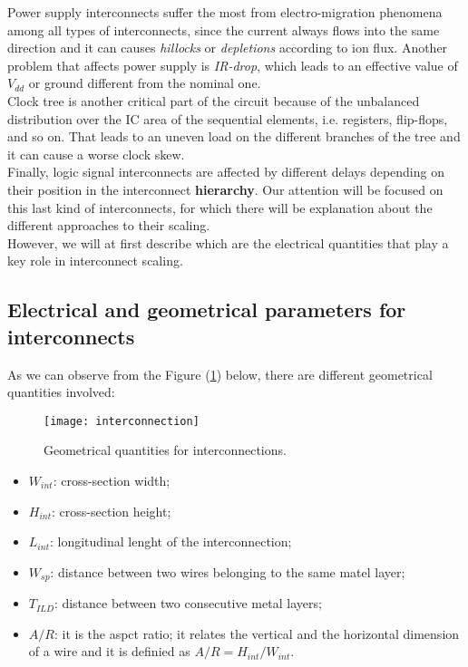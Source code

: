 \documentclass[a4paper, 12pt, twoside, openright]{report}
\begin{document}
Power supply interconnects suffer the most from electro-migration phenomena among all types of interconnects, since the current always flows into the same direction and it can causes \textit{hillocks} or \textit{depletions} according to ion flux. Another problem that affects power supply is \textit{IR-drop}, which leads to an effective value of $V_{dd}$ or ground different from the nominal one.\\ Clock tree is another critical part of the circuit because of the unbalanced distribution over the IC area of the sequential elements, i.e. registers, flip-flops, and so on. That leads to an uneven load on the different branches of the tree and it can cause a worse clock skew. \\ Finally, logic signal interconnects are affected by different delays depending on their position in the interconnect \textbf{hierarchy}. Our attention will be focused on this last kind of interconnects, for which there will be explanation about the different approaches to their scaling. \\However, we will at first describe which are the electrical quantities that play a key role in interconnect scaling.

\subsection{Electrical and geometrical parameters for interconnects}
As we can observe from the Figure (\ref{figint}) below, there are different geometrical quantities involved:

	\begin{figure}[H]
	\centering
	\texttt{[image: interconnection]}
	\caption{Geometrical quantities for interconnections.}
	\label{figint}
	\end{figure} 

\begin{itemize}
\item $W_{int}$: cross-section width;
\item $H_{int}$: cross-section height;
\item $L_{int}$: longitudinal lenght of the interconnection;
\item $W_{sp}$: distance between two wires belonging to the same matel layer;
\item $T_{ILD}$: distance between two consecutive metal layers;
\item $A/R$: it is the aspct ratio; it relates the vertical and the horizontal dimension of a wire and it is definied as $A/R=H_{int}/W_{int}$.
\end{itemize}
\end{document}

